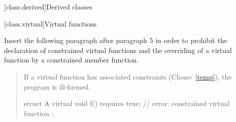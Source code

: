 
\setcounter{chapter}{9}
[class.derived]{Derived classes}

\setcounter{section}{2}
[class.virtual]{Virtual functions}

Insert the following paragraph after paragraph 5 in order to
prohibit the declaration of constrained virtual functions and
the overriding of a virtual function by a constrained member
function.

\begin{quote}
\begin{addedblock}
\setcounter{Paras}{5}

\pnum
If a virtual function has associated constraints (Clause~\ref{temp}), the 
program is ill-formed.
%
\enterexample
\begin{codeblock}
struct A {
  virtual void f() requires true; // error: constrained virtual function
};
\end{codeblock}
\exitexample
\end{addedblock}
\end{quote}

